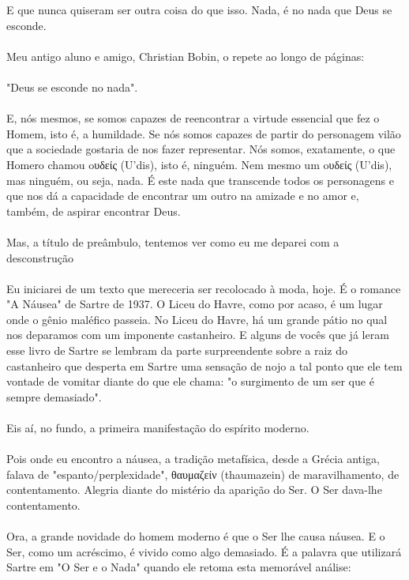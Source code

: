 \documentclass[10pt,a4paper]{book}
\begin{document}
	E que nunca quiseram ser outra coisa do que isso. Nada, é no nada que Deus se esconde.\\
	\\
	Meu antigo aluno e amigo, Christian Bobin, o repete ao longo de páginas:\\
	\\
	"Deus se esconde no nada".\\
	\\
	E, nós mesmos, se somos capazes de reencontrar a virtude essencial que fez o Homem, isto é, a humildade. Se nós somos capazes de partir do personagem vilão que a sociedade gostaria de nos fazer representar. Nós somos, exatamente, o que Homero chamou oυδείς (U'dis), isto é, ninguém. Nem mesmo um oυδείς (U'dis), mas ninguém, ou seja, nada. É este nada que transcende todos os personagens e que nos dá a capacidade de encontrar um outro na amizade e no amor e, também, de aspirar encontrar Deus.\\
	\\
	Mas, a título de preâmbulo, tentemos ver como eu me deparei com a desconstrução\\
	\\
	Eu iniciarei de um texto que mereceria ser recolocado à moda, hoje. É o romance "A Náusea" de Sartre de 1937. O Liceu do Havre, como por acaso, é um lugar onde o gênio maléfico passeia. No Liceu do Havre, há um grande pátio no qual nos deparamos com um imponente castanheiro. E alguns de vocês que já leram esse livro de Sartre se lembram da parte surpreendente sobre a raiz do castanheiro que desperta em Sartre uma sensação de nojo a tal ponto que ele tem vontade de vomitar diante do que ele chama: "o surgimento de um ser que é sempre demasiado".\\
	\\
	Eis aí, no fundo, a primeira manifestação do espírito moderno.\\
	\\
	Pois onde eu encontro a náusea, a tradição metafísica, desde a Grécia antiga, falava de "espanto/perplexidade", θαυμαζείν (thaumazein) de maravilhamento, de contentamento. Alegria diante do mistério da aparição do Ser. O Ser dava-lhe contentamento.\\
	\\
	Ora, a grande novidade do homem moderno é que o Ser lhe causa náusea. E o Ser, como um acréscimo, é vivido como algo demasiado. É a palavra que utilizará Sartre em "O Ser e o Nada" quando ele retoma esta memorável análise:\\
	\\
\end{document}
